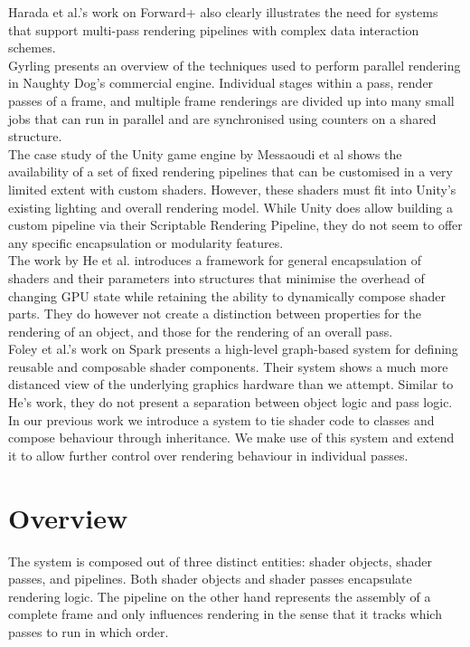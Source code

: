\documentclass[format=sigconf]{acmart}
\begin{document}
Harada et al.'s work on Forward+\cite{forward+}\cite{forward+talk} also clearly illustrates the need for systems that support multi-pass rendering pipelines with complex data interaction schemes. \\

Gyrling\cite{fibers} presents an overview of the techniques used to perform parallel rendering in Naughty Dog's commercial engine. Individual stages within a pass, render passes of a frame, and multiple frame renderings are divided up into many small jobs that can run in parallel and are synchronised using counters on a shared structure. \\

The case study of the Unity game engine by Messaoudi et al\cite{unity} shows the availability of a set of fixed rendering pipelines that can be customised in a very limited extent with custom shaders. However, these shaders must fit into Unity's existing lighting and overall rendering model. While Unity does allow building a custom pipeline via their Scriptable Rendering Pipeline\cite{unitycustom}, they do not seem to offer any specific encapsulation or modularity features. \\

The work by He et al.\cite{components} introduces a framework for general encapsulation of shaders and their parameters into structures that minimise the overhead of changing GPU state while retaining the ability to dynamically compose shader parts. They do however not create a distinction between properties for the rendering of an object, and those for the rendering of an overall pass. \\

Foley et al.'s work on Spark\cite{spark} presents a high-level graph-based system for defining reusable and composable shader components. Their system shows a much more distanced view of the underlying graphics hardware than we attempt. Similar to He's work, they do not present a separation between object logic and pass logic. \\

In our previous work\cite{glsloop} we introduce a system to tie shader code to classes and compose behaviour through inheritance. We make use of this system and extend it to allow further control over rendering behaviour in individual passes.

\section{Overview}\label{overview}
The system is composed out of three distinct entities: shader objects, shader passes, and pipelines. Both shader objects and shader passes encapsulate rendering logic. The pipeline on the other hand represents the assembly of a complete frame and only influences rendering in the sense that it tracks which passes to run in which order. \\
\end{document}
